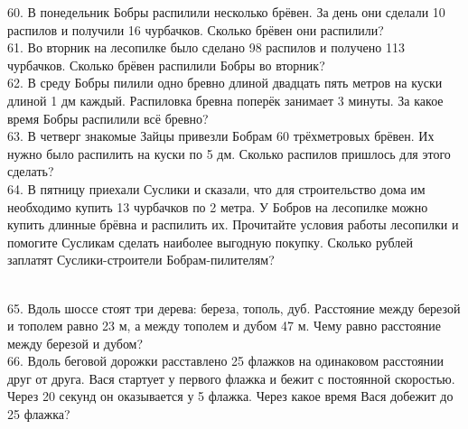 \documentclass[12pt]{article}
\begin{document}
60. В понедельник Бобры распилили несколько брёвен. За день они сделали 10 распилов и получили 16 чурбачков. Сколько брёвен они распилили?\\
61. Во вторник на лесопилке было сделано 98 распилов и получено 113 чурбачков. Сколько брёвен распилили Бобры во вторник?\\
62. В среду Бобры пилили одно бревно длиной двадцать пять метров на куски длиной 1 дм каждый. Распиловка бревна поперёк занимает 3 минуты. За какое время Бобры распилили всё бревно?\\
63. В четверг знакомые Зайцы привезли Бобрам 60 трёхметровых брёвен. Их нужно было распилить на куски по 5 дм. Сколько распилов пришлось для этого сделать?\\
64. В пятницу приехали Суслики и сказали, что для строительство дома им необходимо купить 13 чурбачков по 2 метра. У Бобров на лесопилке можно купить длинные брёвна и распилить их. Прочитайте условия работы лесопилки и помогите Сусликам сделать наиболее выгодную покупку. Сколько рублей заплатят Суслики-строители Бобрам-пилителям?
\begin{figure}[h]
\end{figure}\\
65. Вдоль шоссе стоят три дерева: береза, тополь, дуб. Расстояние между березой и тополем равно 23 м, а между тополем и дубом 47 м. Чему равно расстояние между березой и дубом?\\
66. Вдоль беговой дорожки расставлено 25 флажков на одинаковом расстоянии друг от друга. Вася стартует у первого флажка и бежит с постоянной скоростью. Через 20 секунд он оказывается у 5 флажка. Через какое время Вася добежит до 25 флажка?\\
\end{document}
